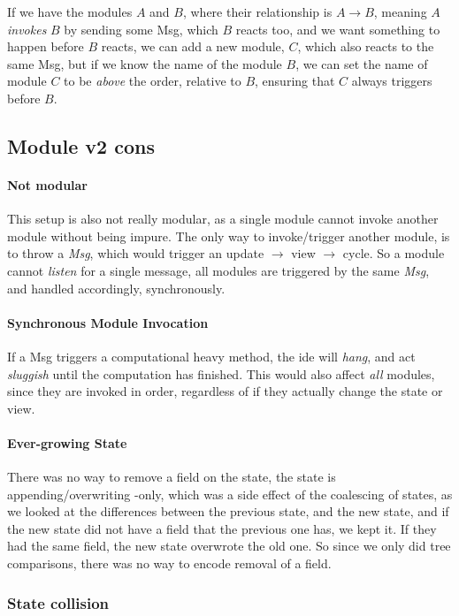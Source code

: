 If we have the modules $A$ and $B$, where their relationship is $A \to B$,
meaning $A$ \textit{invokes} $B$ by sending some Msg, which $B$ reacts too, and
we want something to happen before $B$ reacts, we can add a new module, $C$,
which also reacts to the same Msg, but if we know the name of the module $B$,
we can set the name of module $C$ to be \textit{above} the order, relative to
$B$, ensuring that $C$ always triggers before $B$.

\subsection{Module v2 cons}

\paragraph{Not modular} This setup is also not really modular, as a single
module cannot invoke another module without being impure. The only way to
invoke/trigger another module, is to throw a \textit{Msg}, which would trigger
an update $\to$ view $\to$ cycle. So a module cannot \textit{listen} for a single
message, all modules are triggered by the same \textit{Msg}, and handled
accordingly, synchronously.

\paragraph{Synchronous Module Invocation} If a Msg triggers a computational
heavy method, the \gls*{ide} will \textit{hang}, and act \textit{sluggish} until
the computation has finished. This would also affect \textit{all} modules,
since they are invoked in order, regardless of if they actually change the
state or view.

\paragraph{Ever-growing State} There was no way to remove a field on the state,
the state is appending/overwriting -only, which was a side effect of the
coalescing of states, as we looked at the differences between the previous
state, and the new state, and if the new state did not have a field that the
previous one has, we kept it. If they had the same field, the new state
overwrote the old one. So since we only did tree comparisons, there was no way
to encode removal of a field.

\subsubsection{State collision} \label{sec:collision}

